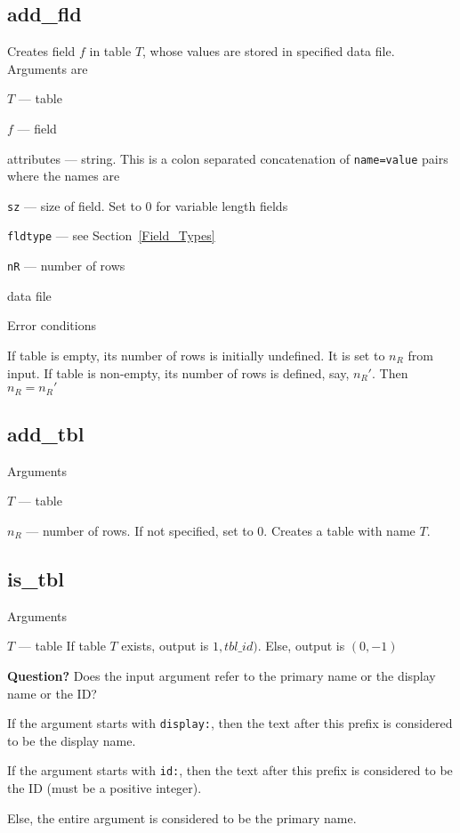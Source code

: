 
\subsection{add\_fld}
\label{add_fld}

Creates field \(f\) in table \(T\), whose values are stored in specified
data file.  Arguments are 
\be
\item \(T\) --- table
\item \(f\) --- field
\item attributes --- string. This is a colon separated concatenation of
\verb+name=value+ pairs where the names are
\be
\item \verb+sz+ --- size of field. Set to 0 for variable length fields
\item \verb+fldtype+ --- see Section~\ref{Field_Types}
\ee
\item \verb+nR+ --- number of rows
\item data file
\ee

Error conditions
\be
\item If table is empty, its number of rows is initially undefined. It
is set to \(n_R\) from input.  If table is non-empty, its number of rows
is defined, say, \(n_R'\). Then \(n_R = n_R'\)
\ee


\subsection{add\_tbl}
\label{add_tbl}
Arguments 
\be
\item \(T\) --- table
\item \(n_R\) --- number of rows. If not specified, set to 0.
\ee
Creates a table with name \(T\).

\subsection{is\_tbl}
\label{is_tbl}
Arguments 
\be
\item \(T\) --- table
\ee
If table \(T\) exists, output is \(1, tbl\_id)\). Else, 
output is \((0, -1)\)

{\bf Question?} Does the input argument refer to the primary name
or the display name or the ID? 
\bi
\item If the argument starts with {\tt display:}, then the text after 
this prefix is considered to be the display name.
\item If the argument starts with {\tt id:}, then the text after 
this prefix is considered to be the ID (must be a positive integer).
\item Else, the entire argument is considered to be the primary name.
\ei

